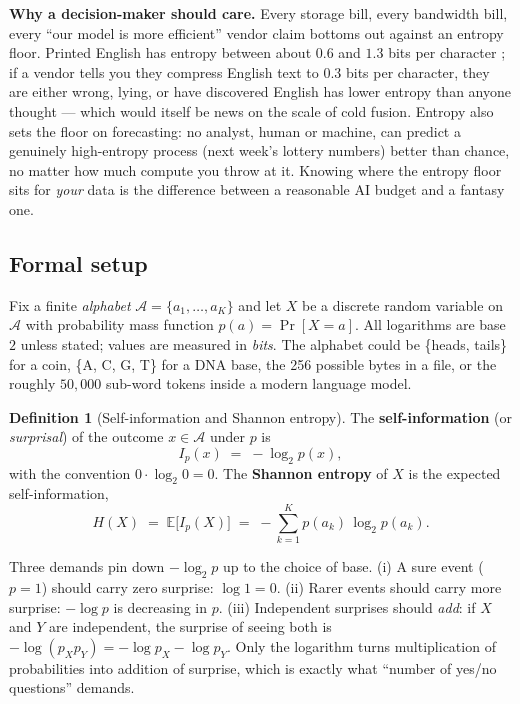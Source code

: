 \documentclass[12pt,a4paper]{article}
\theoremstyle{plain}
\theoremstyle{definition}
\newtheorem{definition}[theorem]{Definition}
\begin{document}
\begin{intuition}
\textbf{Why a decision-maker should care.} Every storage bill, every
bandwidth bill, every ``our model is more efficient'' vendor claim
bottoms out against an entropy floor. Printed English has entropy
between about $0.6$ and $1.3$ bits per character \citep[Ch.~6]{coverthomas2006};
if a vendor tells you they compress English text to $0.3$ bits per
character, they are either wrong, lying, or have discovered English
has lower entropy than anyone thought --- which would itself be news
on the scale of cold fusion. Entropy also sets the floor on
forecasting: no analyst, human or machine, can predict a genuinely
high-entropy process (next week's lottery numbers) better than
chance, no matter how much compute you throw at it. Knowing where
the entropy floor sits for \emph{your} data is the difference
between a reasonable AI budget and a fantasy one.
\end{intuition}

\subsection*{Formal setup}

Fix a finite \emph{alphabet} $\mathcal{A} = \{a_1, \dots, a_K\}$ and
let $X$ be a discrete random variable on $\mathcal{A}$ with
probability mass function $p(a) = \Pr[X = a]$. All logarithms are
base $2$ unless stated; values are measured in \emph{bits}. The
alphabet could be \{heads, tails\} for a coin, \{A, C, G, T\} for a
DNA base, the 256 possible bytes in a file, or the roughly $50{,}000$
sub-word tokens inside a modern language model.

\begin{definition}[Self-information and Shannon entropy]
\label{def:entropy}
The \textbf{self-information} (or \emph{surprisal}) of the outcome
$x \in \mathcal{A}$ under $p$ is
\begin{equation}
  I_p(x) \;=\; -\log_2 p(x),
  \label{eq:self-info}
\end{equation}
with the convention $0 \cdot \log_2 0 = 0$. The \textbf{Shannon
entropy} of $X$ is the expected self-information,
\begin{equation}
  H(X) \;=\; \mathbb{E}\bigl[I_p(X)\bigr]
       \;=\; -\sum_{k=1}^{K} p(a_k)\,\log_2 p(a_k).
  \label{eq:entropy}
\end{equation}
\end{definition}

\begin{aside}[title={Why the logarithm?}]
Three demands pin down $-\log_2 p$ up to the choice of base.
(i) A sure event ($p=1$) should carry zero surprise: $\log 1 = 0$.
(ii) Rarer events should carry more surprise: $-\log p$ is decreasing
in $p$. (iii) Independent surprises should \emph{add}: if $X$ and
$Y$ are independent, the surprise of seeing both is
$-\log(p_X p_Y) = -\log p_X - \log p_Y$. Only the logarithm turns
multiplication of probabilities into addition of surprise, which is
exactly what ``number of yes/no questions'' demands.
\end{aside}
\end{document}
